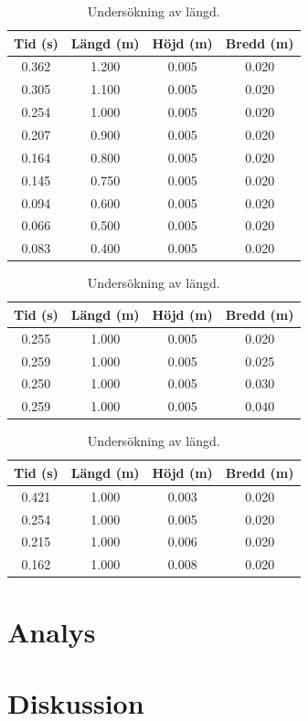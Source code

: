 \documentclass[10pt, titlepage, oneside, a4paper]{article}
\begin{document}
    \begin{table}
        \caption{Undersökning av längd.}
        \begin{center}
            \begin{tabular}{cccc}
                \hline
                Tid (s) & Längd (m) & Höjd (m) & Bredd (m)\\
                \hline
                0.362 & 1.200 & 0.005 & 0.020\\
                0.305 & 1.100 & 0.005 & 0.020\\
                0.254 & 1.000 & 0.005 & 0.020\\
                0.207 & 0.900 & 0.005 & 0.020\\
                0.164 & 0.800 & 0.005 & 0.020\\
                0.145 & 0.750 & 0.005 & 0.020\\
                0.094 & 0.600 & 0.005 & 0.020\\
                0.066 & 0.500 & 0.005 & 0.020\\
                0.083 & 0.400 & 0.005 & 0.020\\
            \end{tabular}
        \end{center}
    \end{table}

    \begin{table}
        \caption{Undersökning av längd.}
        \begin{center}
            \begin{tabular}{cccc}
                \hline
                Tid (s) & Längd (m) & Höjd (m) & Bredd (m)\\
                \hline
                0.255 & 1.000 & 0.005 & 0.020\\
                0.259 & 1.000 & 0.005 & 0.025\\
                0.250 & 1.000 & 0.005 & 0.030\\
                0.259 & 1.000 & 0.005 & 0.040\\
            \end{tabular}
        \end{center}
    \end{table}

    \begin{table}
        \caption{Undersökning av längd.}
        \begin{center}
            \begin{tabular}{cccc}
                \hline
                Tid (s) & Längd (m) & Höjd (m) & Bredd (m)\\
                \hline
                0.421 & 1.000 & 0.003 & 0.020\\
                0.254 & 1.000 & 0.005 & 0.020\\
                0.215 & 1.000 & 0.006 & 0.020\\
                0.162 & 1.000 & 0.008 & 0.020\\
            \end{tabular}
        \end{center}
    \end{table}

	\section{Analys}
    \section{Diskussion}
\end{document}
